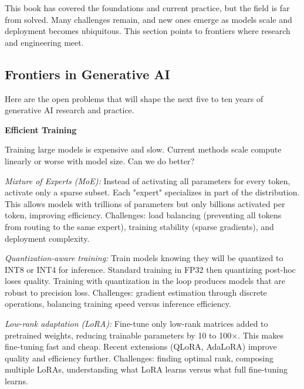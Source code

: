 
This book has covered the foundations and current practice, but the field is far from solved. Many challenges remain, and new ones emerge as models scale and deployment becomes ubiquitous. This section points to frontiers where research and engineering meet.

\vspace{1em}

\subsection{Frontiers in Generative AI}

Here are the open problems that will shape the next five to ten years of generative AI research and practice.

\vspace{0.5em}

\textbf{Efficient Training}

Training large models is expensive and slow. Current methods scale compute linearly or worse with model size. Can we do better?

\textit{Mixture of Experts (MoE):} Instead of activating all parameters for every token, activate only a sparse subset. Each "expert" specializes in part of the distribution. This allows models with trillions of parameters but only billions activated per token, improving efficiency. Challenges: load balancing (preventing all tokens from routing to the same expert), training stability (sparse gradients), and deployment complexity.

\textit{Quantization-aware training:} Train models knowing they will be quantized to INT8 or INT4 for inference. Standard training in FP32 then quantizing post-hoc loses quality. Training with quantization in the loop produces models that are robust to precision loss. Challenges: gradient estimation through discrete operations, balancing training speed versus inference efficiency.

\textit{Low-rank adaptation (LoRA):} Fine-tune only low-rank matrices added to pretrained weights, reducing trainable parameters by 10 to 100$\times$. This makes fine-tuning fast and cheap. Recent extensions (QLoRA, AdaLoRA) improve quality and efficiency further. Challenges: finding optimal rank, composing multiple LoRAs, understanding what LoRA learns versus what full fine-tuning learns.

\vspace{0.5em}

